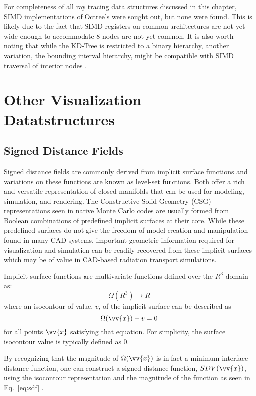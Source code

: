For completeness of all ray tracing data structures discussed in this chapter,
SIMD implementations of Octree's were sought out, but none were found. This is
likely due to the fact that SIMD registers on common architectures are not yet
wide enough to accommodate 8 nodes are not yet common. It is also worth noting
that while the KD-Tree is restricted to a binary hierarchy, another variation,
the bounding interval hierarchy, might be compatible with SIMD traversal of
interior nodes \cite{Watcher_2006}.

\section{Other Visualization Datatstructures}

\subsection{Signed Distance Fields}

Signed distance fields are commonly derived from implicit surface functions and
variations on these functions are known as level-set functions. Both offer a rich
and versatile representation of closed manifolds that can be used for modeling,
simulation, and rendering. The Constructive Solid Geometry (CSG) representations
seen in native Monte Carlo codes are usually formed from Boolean combinations of
predefined implicit surfaces at their core. While these predefined surfaces do
not give the freedom of model creation and manipulation found in many CAD
systems, important geometric information required for visualization and
simulation can be readily recovered from these implicit surfaces which may be of
value in CAD-based radiation transport simulations.

Implicit surface functions are multivariate functions defined over the
$R^3$ domain as:
\begin{equation} \label{eq:implicit_surf_rep}
      \Omega(R^3)\rightarrow R
\end{equation}
where an isocontour of value, $v$, of the implicit surface can be
described as
\begin{equation} \label{eq:implicit_surf_isocontour}
  \Omega(\vv{x}) - v  = 0 
\end{equation}
for all points $\vv{x}$ satisfying that equation. For simplicity, the surface
isocontour value is typically defined as $0$. 

By recognizing that the magnitude of $\Omega(\vv{x})$ is in fact a
minimum interface distance function, one can construct a signed
distance function, $SDV(\vv{x})$, using the isocontour representation
and the magnitude of the function as seen in Eq.~\ref{eq:sdf}
\cite{Osher_2003}.

